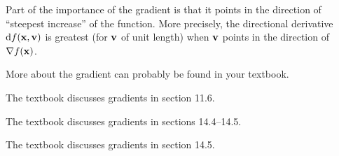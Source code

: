 \documentclass[12pt]{amsart}
\begin{document}
Part of the importance of the gradient is that it points in the direction of ``steepest increase'' of the function.
More precisely, the directional derivative ${\mathrm{d} f}(\mathbf{x},\mathbf{v})$ is greatest (for $\mathbf{v}$ of unit length) when $\mathbf{v}$ points in the direction of $\nabla f(\mathbf{x})$.
\begin{notextbook}More about the gradient can probably be found in your textbook.\end{notextbook}%
\begin{stewart}The textbook discusses gradients in section 11.6.\end{stewart}%
\begin{hugheshallett}The textbook discusses gradients in sections 14.4--14.5.\end{hugheshallett}%
\begin{rogawski}The textbook discusses gradients in section 14.5.\end{rogawski}%
\end{document}
